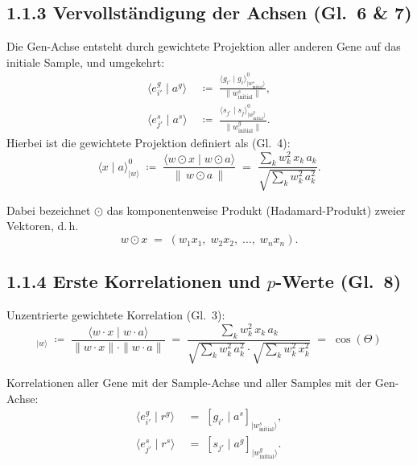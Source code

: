 \subsection*{1.1.3 Vervollst\"{a}ndigung der Achsen (Gl.~6 \& 7)}
 
Die Gen-Achse entsteht durch gewichtete Projektion aller anderen Gene
auf das initiale Sample, und umgekehrt:
\begin{align}
    \langle e^g_{i'} \mid a^g \rangle
    &\;\coloneqq\;
    \frac{\langle g_{i'} \mid g_i \rangle^0_{|w^s_{\mathrm{initial}}\rangle}}
         {\|w^s_{\mathrm{initial}}\|},
    \\[6pt]
    \langle e^s_{j'} \mid a^s \rangle
    &\;\coloneqq\;
    \frac{\langle s_{j'} \mid s_j \rangle^0_{|w^g_{\mathrm{initial}}\rangle}}
         {\|w^g_{\mathrm{initial}}\|}.
\end{align}
Hierbei ist die gewichtete Projektion definiert als (Gl.~4):
\begin{equation}
    \langle x \mid a \rangle^0_{|w\rangle}
    \;\coloneqq\;
    \frac{\langle w \odot x \mid w \odot a \rangle}{\|\, w \odot a \,\|}
        \;=\;
    \frac{\sum_{k} w_k^2\, x_k\, a_k}
         {\sqrt{\sum_{k} w_k^2\, a_k^2}}.
\end{equation}

Dabei bezeichnet $\odot$ das komponentenweise Produkt (Hadamard-Produkt) zweier Vektoren, d.\,h.
\[
w \odot x \;=\; (w_1 x_1,\; w_2 x_2,\; \dots,\; w_n x_n).
\]
 
\subsection*{1.1.4 Erste Korrelationen und $p$-Werte (Gl.~8)}
 
Unzentrierte gewichtete Korrelation (Gl.~3):
\begin{equation}
    [x \mid a]_{|w\rangle}
    \;\coloneqq\;
    \frac{\langle w \cdot x \mid w \cdot a \rangle}
         {\|w \cdot x\| \cdot \|w \cdot a\|}
                 \;=\;
    \frac{\sum_{k} w_k^2\, x_k\, a_k}
         {\sqrt{\sum_{k} w_k^2\, a_k^2}\cdot \sqrt{\sum_{k} w_k^2\, x_k^2}}
         \;=\;
         \cos (\Theta)
\end{equation}
 
Korrelationen aller Gene mit der Sample-Achse und aller Samples mit
der Gen-Achse:
\begin{align}
    \langle e^g_{i'} \mid r^g \rangle
    &\;=\; [g_{i'} \mid a^s]_{|w^s_{\mathrm{initial}}\rangle},
    \\[4pt]
    \langle e^s_{j'} \mid r^s \rangle
    &\;=\; [s_{j'} \mid a^g]_{|w^g_{\mathrm{initial}}\rangle}.
\end{align}
 
